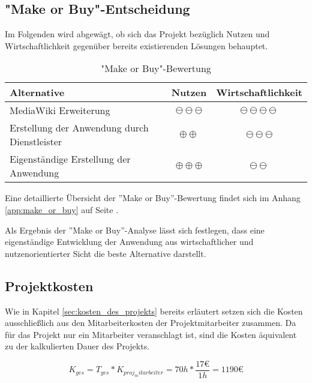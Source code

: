 \documentclass[12pt, xcolor=dvipsnames]{scrartcl}
\begin{document}
\subsection{"Make or Buy"-Entscheidung}

Im Folgenden wird abgewägt, ob sich das Projekt bezüglich Nutzen und Wirtschaftlichkeit gegenüber bereits existierenden Lösungen behauptet.


\begin{table}[H]
	\centering
	\begin{tabular}{lcc}

		\rowcolor{white!15}				
		\textbf{Alternative} & \textbf{Nutzen} & \textbf{Wirtschaftlichkeit} \\\hline		
				
		MediaWiki Erweiterung & $\ominus\ominus\ominus$ & $\ominus\ominus\ominus\ominus$ \\		
		Erstellung der Anwendung durch Dienstleister & $\oplus\oplus$ & $\ominus\ominus\ominus$ \\		
		Eigenständige Erstellung der Anwendung & $\oplus\oplus\oplus$ & $\ominus\ominus$ \\
	
			    
	\end{tabular}
	\caption{"Make or Buy"-Bewertung}
	\label{tab:make_or_buy}
\end{table}

Eine detaillierte Übersicht der ''Make or Buy''-Bewertung findet sich im Anhang \ref{app:make_or_buy} auf Seite \pageref{app:make_or_buy}.


Als Ergebnis der ''Make or Buy''-Analyse lässt sich festlegen, dass eine eigenständige Entwicklung der Anwendung aus wirtschaftlicher und nutzenorientierter Sicht die beste Alternative darstellt.


\subsection{Projektkosten}

Wie in Kapitel \ref{sec:kosten_des_projekts} bereits erläutert setzen sich die Kosten ausschließlich aus den Mitarbeiterkosten der Projektmitarbeiter zusammen. Da für das Projekt nur ein Mitarbeiter veranschlagt ist, sind die Kosten äquivalent zu der kalkulierten Dauer des Projekts.

\begin{equation} \label{eq:5}
	K_{ges} = T_{ges} * K_{proj_mitarbeiter} = 70h * \frac{17 \euro}{1h} = 1190 \euro
\end{equation}
\end{document}
